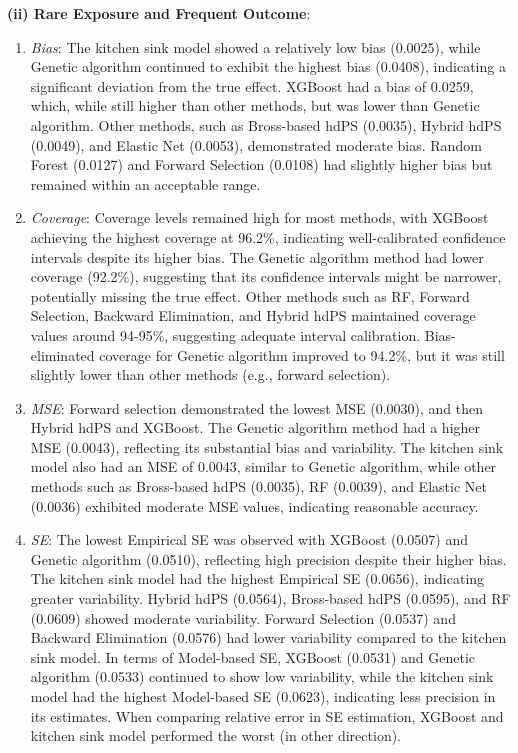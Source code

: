 \documentclass[sn-vancouver,Numbered,lineno,pdflatex]{sn-jnl}
\begin{document}
\textbf{(ii) Rare Exposure and Frequent Outcome}:

\begin{enumerate}
\def\labelenumi{\arabic{enumi}.}
\item
  \emph{Bias}: The kitchen sink model showed a relatively low bias
  (0.0025), while Genetic algorithm continued to exhibit the highest
  bias (0.0408), indicating a significant deviation from the true
  effect. XGBoost had a bias of 0.0259, which, while still higher than
  other methods, but was lower than Genetic algorithm. Other methods,
  such as Bross-based hdPS (0.0035), Hybrid hdPS (0.0049), and Elastic
  Net (0.0053), demonstrated moderate bias. Random Forest (0.0127) and
  Forward Selection (0.0108) had slightly higher bias but remained
  within an acceptable range.
\item
  \emph{Coverage}: Coverage levels remained high for most methods, with
  XGBoost achieving the highest coverage at 96.2\%, indicating
  well-calibrated confidence intervals despite its higher bias. The
  Genetic algorithm method had lower coverage (92.2\%), suggesting that
  its confidence intervals might be narrower, potentially missing the
  true effect. Other methods such as RF, Forward Selection, Backward
  Elimination, and Hybrid hdPS maintained coverage values around
  94-95\%, suggesting adequate interval calibration. Bias-eliminated
  coverage for Genetic algorithm improved to 94.2\%, but it was still
  slightly lower than other methods (e.g., forward selection).
\item
  \emph{MSE}: Forward selection demonstrated the lowest MSE (0.0030),
  and then Hybrid hdPS and XGBoost. The Genetic algorithm method had a
  higher MSE (0.0043), reflecting its substantial bias and variability.
  The kitchen sink model also had an MSE of 0.0043, similar to Genetic
  algorithm, while other methods such as Bross-based hdPS (0.0035), RF
  (0.0039), and Elastic Net (0.0036) exhibited moderate MSE values,
  indicating reasonable accuracy.
\item
  \emph{SE}: The lowest Empirical SE was observed with XGBoost (0.0507)
  and Genetic algorithm (0.0510), reflecting high precision despite
  their higher bias. The kitchen sink model had the highest Empirical SE
  (0.0656), indicating greater variability. Hybrid hdPS (0.0564),
  Bross-based hdPS (0.0595), and RF (0.0609) showed moderate
  variability. Forward Selection (0.0537) and Backward Elimination
  (0.0576) had lower variability compared to the kitchen sink model. In
  terms of Model-based SE, XGBoost (0.0531) and Genetic algorithm
  (0.0533) continued to show low variability, while the kitchen sink
  model had the highest Model-based SE (0.0623), indicating less
  precision in its estimates. When comparing relative error in SE
  estimation, XGBoost and kitchen sink model performed the worst (in
  other direction).
\end{enumerate}
\end{document}
